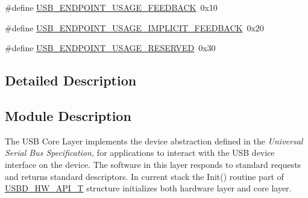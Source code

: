 \begin{DoxyCompactItemize}
\item 
\#define \hyperlink{group__USBD__Core_gabe8c89e5b624ac6bb5b9cd2919fc06be}{U\-S\-B\-\_\-\-E\-N\-D\-P\-O\-I\-N\-T\-\_\-\-U\-S\-A\-G\-E\-\_\-\-F\-E\-E\-D\-B\-A\-C\-K}~0x10
\item 
\#define \hyperlink{group__USBD__Core_gabfdb9f73f34907249b8fd1128c25ae1a}{U\-S\-B\-\_\-\-E\-N\-D\-P\-O\-I\-N\-T\-\_\-\-U\-S\-A\-G\-E\-\_\-\-I\-M\-P\-L\-I\-C\-I\-T\-\_\-\-F\-E\-E\-D\-B\-A\-C\-K}~0x20
\item 
\#define \hyperlink{group__USBD__Core_ga0ee1319e7242bb61298af850ea64f08a}{U\-S\-B\-\_\-\-E\-N\-D\-P\-O\-I\-N\-T\-\_\-\-U\-S\-A\-G\-E\-\_\-\-R\-E\-S\-E\-R\-V\-E\-D}~0x30
\end{DoxyCompactItemize}


\subsection{Detailed Description}
\hypertarget{group__USBD__Core_Sec_CoreModDescription}{}\subsection{Module Description}\label{group__USBD__Core_Sec_CoreModDescription}
The U\-S\-B Core Layer implements the device abstraction defined in the {\itshape  Universal Serial Bus Specification, } for applications to interact with the U\-S\-B device interface on the device. The software in this layer responds to standard requests and returns standard descriptors. In current stack the Init() routine part of \hyperlink{group__USBD__HW_ga4df5b7beaddc4e9267c320d92b4434fc}{U\-S\-B\-D\-\_\-\-H\-W\-\_\-\-A\-P\-I\-\_\-\-T} structure initializes both hardware layer and core layer. 

